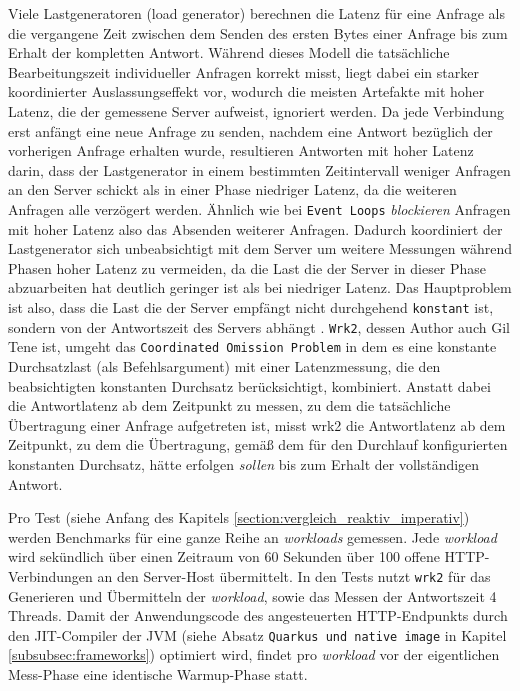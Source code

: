 Viele Lastgeneratoren (load generator) berechnen die Latenz für eine Anfrage als die vergangene Zeit zwischen dem Senden des ersten Bytes einer Anfrage
bis zum Erhalt der kompletten Antwort. Während dieses Modell die tatsächliche Bearbeitungszeit individueller Anfragen korrekt misst,
liegt dabei ein starker koordinierter Auslassungseffekt vor,
wodurch die meisten Artefakte mit hoher Latenz, die der gemessene Server aufweist, ignoriert werden.
Da jede Verbindung erst anfängt eine neue Anfrage zu senden, nachdem eine Antwort bezüglich der vorherigen Anfrage erhalten wurde,
resultieren Antworten mit hoher Latenz darin, dass der Lastgenerator in einem bestimmten Zeitintervall weniger Anfragen an den Server schickt als in einer
Phase niedriger Latenz, da die weiteren Anfragen alle verzögert werden. Ähnlich wie bei \verb|Event Loops| \textit{blockieren}
Anfragen mit hoher Latenz also das Absenden weiterer Anfragen.
Dadurch koordiniert der Lastgenerator sich unbeabsichtigt mit dem Server um weitere Messungen während Phasen hoher Latenz zu vermeiden, da die Last die der Server
in dieser Phase abzuarbeiten hat deutlich geringer ist als bei niedriger Latenz. Das Hauptproblem ist also, dass die Last die der Server empfängt
nicht durchgehend \verb|konstant| ist, sondern von der Antwortszeit des Servers abhängt \parencite{mci/Friedrich2017}.
\newline\newline
\verb|Wrk2|, dessen Author auch Gil Tene ist, umgeht das \verb|Coordinated Omission Problem| in dem es eine konstante Durchsatzlast (als Befehlsargument) mit
einer Latenzmessung, die den beabsichtigten konstanten Durchsatz berücksichtigt, kombiniert. Anstatt dabei die Antwortlatenz ab dem Zeitpunkt zu messen,
zu dem die tatsächliche Übertragung einer Anfrage aufgetreten ist, misst wrk2 die Antwortlatenz ab dem Zeitpunkt, zu dem die Übertragung,
gemäß dem für den Durchlauf konfigurierten konstanten Durchsatz, hätte erfolgen \textit{sollen} bis zum Erhalt der vollständigen Antwort\parencite{Wrk2}.

Pro Test (siehe Anfang des Kapitels \ref{section:vergleich_reaktiv_imperativ}) werden Benchmarks für eine ganze Reihe an \textit{workloads} gemessen.
Jede \textit{workload} wird sekündlich über einen Zeitraum von 60 Sekunden über 100 offene HTTP-Verbindungen an den Server-Host übermittelt.
In den Tests nutzt \verb|wrk2| für das Generieren und Übermitteln der \textit{workload}, sowie das Messen der Antwortszeit
4 Threads.
\newline\newline
Damit der Anwendungscode des angesteuerten HTTP-Endpunkts durch den JIT-Compiler der JVM (siehe Absatz \verb|Quarkus und native image| in Kapitel
\ref{subsubsec:frameworks}) optimiert wird, findet pro \textit{workload} vor der eigentlichen Mess-Phase eine identische Warmup-Phase statt.

